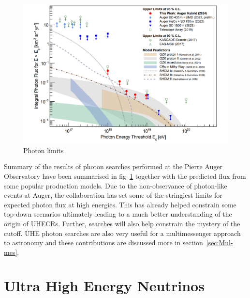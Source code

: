 \begin{figure}[t!]
  \centering
  \includegraphics[width=14.5cm]{thesis_figures/CRnNu/Photon-limits.png}
  \caption{Photon limits~\cite{PierreAuger:2024ayl}}
  \label{fig:Auger-Photon-limits}
\end{figure}

Summary of the results of photon searches performed at the Pierre Auger Observatory have been summarised in fig~\ref{fig:Auger-Photon-limits} together with the predicted flux from some popular production models. Due to the non-observance of photon-like events at Auger, the collaboration has set some of the stringiest limits for expected photon flux at high energies. This has already helped constrain some top-down scenarios ultimately leading to a much better understanding of the origin of UHECRs. Further, searches will also help constrain the mystery of the cutoff. UHE photon searches are also very useful for a multimessenger approach to astronomy and these contributions are discussed more in section~\ref{sec:Mul-mes}.


\section{Ultra High Energy Neutrinos}
\label{sec:UHENu}
